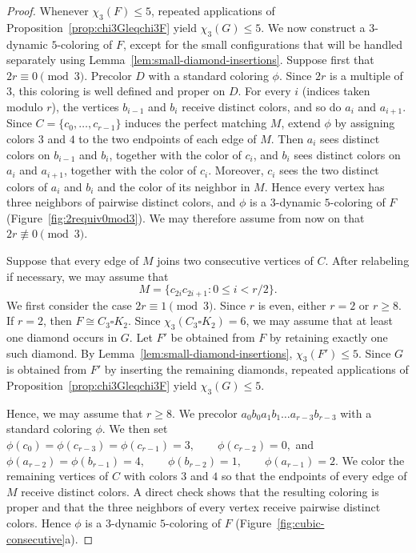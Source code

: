 \begin{proof}
Whenever $\chi_3(F)\leq5$, repeated applications of
Proposition~\ref{prop:chi3Gleqchi3F} yield $\chi_3(G)\leq5$.
We now construct a $3$-dynamic $5$-coloring of $F$, except for the
small configurations that will be handled separately using
Lemma~\ref{lem:small-diamond-insertions}.
Suppose first that $2r\equiv0\pmod3$. Precolor $D$ with a standard
coloring $\phi$. Since $2r$ is a multiple of $3$, this coloring is
well defined and proper on $D$. For every $i$ (indices taken modulo
$r$), the vertices $b_{i-1}$ and $b_i$ receive distinct colors, and
so do $a_i$ and $a_{i+1}$.
Since $C=\{c_0,\ldots,c_{r-1}\}$ induces the perfect matching $M$,
extend $\phi$ by assigning colors $3$ and $4$ to the two endpoints of
each edge of $M$. Then $a_i$ sees distinct colors on $b_{i-1}$ and
$b_i$, together with the color of $c_i$, and $b_i$ sees distinct
colors on $a_i$ and $a_{i+1}$, together with the color of $c_i$.
Moreover, $c_i$ sees the two distinct colors of $a_i$ and $b_i$ and
the color of its neighbor in $M$. Hence every vertex has three
neighbors of pairwise distinct colors, and $\phi$ is a $3$-dynamic
$5$-coloring of $F$ (Figure~\ref{fig:2requiv0mod3}).
We may therefore assume from now on that
$2r\not\equiv0\pmod3$.

Suppose that every edge of $M$ joins two consecutive vertices of $C$.
After relabeling if necessary, we may assume that
\[
M=\{c_{2i}c_{2i+1}:0\leq i<r/2\}.
\]
We first consider the case $2r\equiv1\pmod3$. Since $r$ is even, either
$r=2$ or $r\geq8$.
If $r=2$, then $F\cong C_3\square K_2$. Since
$\chi_3(C_3\square K_2)=6$, we may assume that at least one diamond occurs in $G$.
Let $F'$ be obtained from $F$ by retaining exactly one such diamond.
By Lemma~\ref{lem:small-diamond-insertions},
$\chi_3(F')\leq5$. Since $G$ is obtained from $F'$ by inserting the
remaining diamonds, repeated applications of
Proposition~\ref{prop:chi3Gleqchi3F} yield $\chi_3(G)\leq5$.

Hence, we may assume that $r\geq8$. We precolor
$
a_0b_0a_1b_1\ldots a_{r-3}b_{r-3}
$
with a standard coloring $\phi$. We then set
$
\phi(c_0)=\phi(c_{r-3})=\phi(c_{r-1})=3,
\qquad
\phi(c_{r-2})=0,
$
and
$
\phi(a_{r-2})=\phi(b_{r-1})=4,\qquad
\phi(b_{r-2})=1,\qquad
\phi(a_{r-1})=2.
$
We color the remaining vertices of $C$ with colors $3$ and $4$ so that
the endpoints of every edge of $M$ receive distinct colors.
A direct check shows that the resulting coloring is proper and that the
three neighbors of every vertex receive pairwise distinct colors.
Hence $\phi$ is a $3$-dynamic $5$-coloring of $F$
(Figure~\ref{fig:cubic-consecutive}a).


\end{proof}

